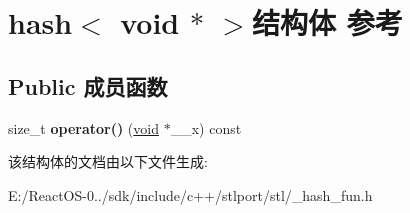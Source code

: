 \hypertarget{structhash_3_01void_01_5_01_4}{}\section{hash$<$ void $\ast$ $>$结构体 参考}
\label{structhash_3_01void_01_5_01_4}
\subsection*{Public 成员函数}
\begin{DoxyCompactItemize}
\item 
\mbox{\label{structhash_3_01void_01_5_01_4_a33f3e824f4e1e44d1fafbec56bb79cf4}} 
size\+\_\+t {\bfseries operator()} (\hyperlink{interfacevoid}{void} $\ast$\+\_\+\+\_\+x) const
\end{DoxyCompactItemize}


该结构体的文档由以下文件生成\+:\begin{DoxyCompactItemize}
\item 
E\+:/\+React\+O\+S-\/0../sdk/include/c++/stlport/stl/\+\_\+hash\+\_\+fun.\+h\end{DoxyCompactItemize}
